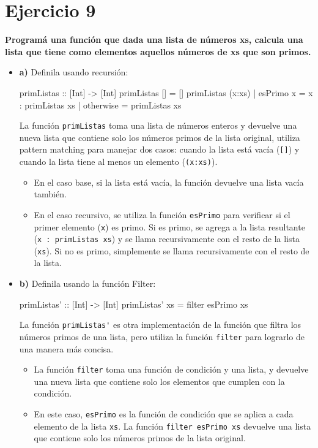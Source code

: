 \documentclass{article}
\begin{document}
\section*{Ejercicio 9}
\textbf{Programá una función que dada una lista de números xs, calcula una lista que tiene como elementos aquellos números de xs que son primos.}

\begin{itemize}
    \item 
    \textbf{a)} Definila usando recursión:
    \begin{haskell}
    primListas :: [Int] -> [Int]
    primListas [] = []
    primListas (x:xs) | esPrimo x = x : primListas xs
                      | otherwise = primListas xs
    \end{haskell}
    
    La función \verb|primListas| toma una lista de números enteros y devuelve una nueva lista que contiene solo los números primos de la lista original, utiliza pattern matching para manejar dos casos: cuando la lista está vacía (\verb|[]|) y cuando la lista tiene al menos un elemento (\verb|(x:xs)|).
    \begin{itemize}
    \item 
    En el caso base, si la lista está vacía, la función devuelve una lista vacía también.
    \item 
    En el caso recursivo, se utiliza la función \verb|esPrimo| para verificar si el primer elemento (\verb|x|) es primo. Si es primo, se agrega a la lista resultante (\verb|x : primListas xs|) y se llama recursivamente con el resto de la lista (\verb|xs|). Si no es primo, simplemente se llama recursivamente con el resto de la lista.
    \end{itemize}


    \item 
    \textbf{b)} Definila usando la función Filter:
\begin{haskell}
primListas' :: [Int] -> [Int]
primListas' xs = filter esPrimo xs
\end{haskell}
        
        La función \verb|primListas'| es otra implementación de la función que filtra los números primos de una lista, pero utiliza la función \verb|filter| para lograrlo de una manera más concisa.
        \begin{itemize}
        \item 
        La función \verb|filter| toma una función de condición y una lista, y devuelve una nueva lista que contiene solo los elementos que cumplen con la condición.
        \item 
        En este caso, \verb|esPrimo| es la función de condición que se aplica a cada elemento de la lista \verb|xs|. La función \verb|filter esPrimo xs| devuelve una lista que contiene solo los números primos de la lista original.
        \end{itemize}   
        

\end{itemize}
\end{document}
